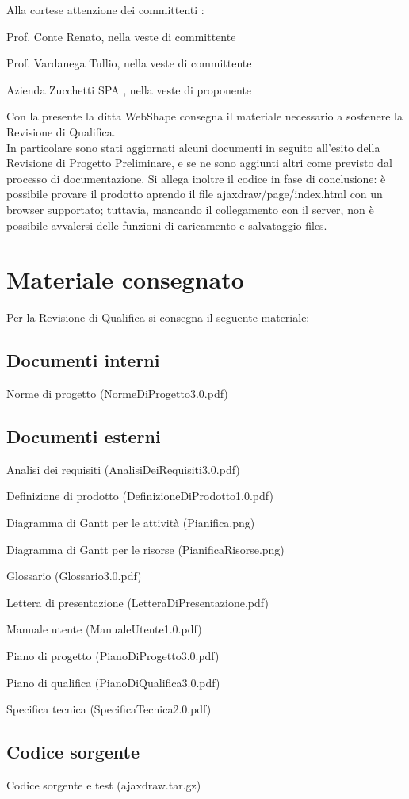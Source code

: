 Alla cortese attenzione dei committenti :
\begin{list}{-}{}
\item Prof. Conte Renato, nella veste di committente
\item Prof. Vardanega Tullio, nella veste di committente
\item Azienda Zucchetti SPA , nella veste di proponente
\end{list}

Con la presente la ditta WebShape consegna il materiale necessario a sostenere la Revisione di Qualifica. \\
In particolare sono stati aggiornati alcuni documenti in seguito all'esito della Revisione di Progetto Preliminare, e se ne sono aggiunti altri come previsto dal processo di documentazione. Si allega inoltre il codice in fase di conclusione: \`e possibile provare il prodotto aprendo il file ajaxdraw/page/index.html con un browser supportato; tuttavia, mancando il collegamento con il server, non \`e possibile avvalersi delle funzioni di caricamento e salvataggio files.


\section{Materiale consegnato}
Per la Revisione di Qualifica si consegna il seguente materiale: 
\subsection{Documenti interni}
\begin{list}{-}{}
\item Norme di progetto (NormeDiProgetto3.0.pdf)
\end{list}
\subsection{Documenti esterni}
\begin{list}{-}{}
\item Analisi dei requisiti (AnalisiDeiRequisiti3.0.pdf)
\item Definizione di prodotto (DefinizioneDiProdotto1.0.pdf)
\item Diagramma di Gantt per le attivit\`a (Pianifica.png)
\item Diagramma di Gantt per le risorse (PianificaRisorse.png)
\item Glossario (Glossario3.0.pdf)
\item Lettera di presentazione (LetteraDiPresentazione.pdf)
\item Manuale utente (ManualeUtente1.0.pdf)
\item Piano di progetto (PianoDiProgetto3.0.pdf)
\item Piano di qualifica (PianoDiQualifica3.0.pdf)
\item Specifica tecnica (SpecificaTecnica2.0.pdf)
\end{list}
\subsection{Codice sorgente}
\begin{list}{-}{}
\item Codice sorgente e test (ajaxdraw.tar.gz)
\end{list}


